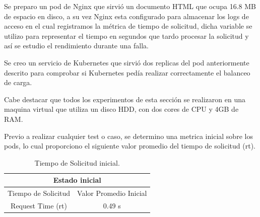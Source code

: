 



\par Se preparo un pod de Nginx que sirvió un documento HTML que ocupa 16.8 MB de espacio en disco, a su vez Nginx esta configurado para almacenar los logs de acceso en el cual registramos la métrica de tiempo de solicitud, dicha variable se utilizo para representar el tiempo en segundos que tardo procesar la solicitud y así se estudio el rendimiento durante una falla.\\

\par Se creo un servicio de Kubernetes que sirvió dos replicas del pod anteriormente descrito para comprobar si Kubernetes pedía realizar correctamente el balanceo de carga.\\

\par Cabe destacar que todos los experimentos de esta sección se realizaron en una maquina virtual que utiliza un disco HDD, con dos cores de CPU y 4GB de RAM.\\

\par Previo a realizar cualquier test o caso, se determino una metrica inicial sobre los pods, lo cual proporciono el siguiente valor promedio del tiempo de solicitud (rt).

\begin{table}[ht!]
\centering
\caption{Tiempo de Solicitud inicial.}
\vspace{0.5\baselineskip}
\begin{tabular}{ |c|c| } 
 \hline
 \multicolumn{2}{|c|}{Estado inicial} \\
 \hline
 \hline
 Tiempo de Solicitud & Valor Promedio Inicial\\
 \hline
 Request Time (rt) & 0.49 s\\
 \hline
\end{tabular}
\label{tab:tabla406}
\end{table}

